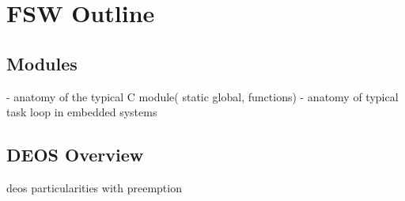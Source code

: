 {\section{FSW Outline}
\subsection{Modules}
- anatomy of the typical C module( static global, functions)
- anatomy of typical task loop in embedded systems 
\subsection{DEOS Overview}
deos particularities with preemption
}